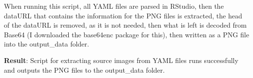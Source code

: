 \documentclass{article}
\begin{document}
When running this script, all YAML files are parsed in RStudio, then the dataURL that contains the information for the PNG files is extracted, the head of the dataURL is removed, as it is not needed, then what is left is decoded from Base64 (I downloaded the base64enc package for this), then written as a PNG file into the output_data folder.

\textbf{Result}: Script for extracting source images from YAML files runs successfully and outputs the PNG files to the output\_data folder.
\end{document}
